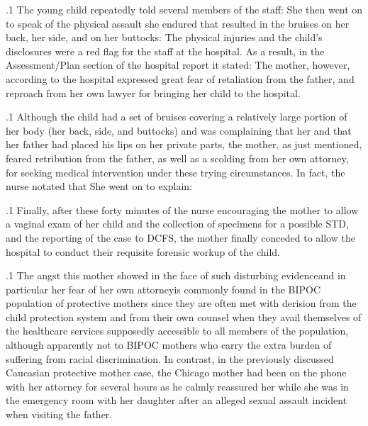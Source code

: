 \documentclass[11pt, twoside]{article}
\begin{document}
{\p.1{%
The young child repeatedly told several members of the staff:  She then went on to speak of the physical assault she endured that resulted in the bruises on her back, her
side, and on her buttocks:  The physical
injuries and the child's disclosures were a red flag for the staff at the
hospital. As a result, in the Assessment/Plan section of the hospital report it stated:  The mother, however, according to the
hospital expressed great fear of retaliation from the father, and reproach
from her own lawyer for bringing her child to the hospital.
}%

\p.1{%
Although the child had a set of bruises covering a relatively large portion of her body (her back, side, and buttocks) and was complaining that
her  and that her father had placed his lips on her
private parts, the mother, as just mentioned, feared retribution from the
father, as well as a scolding from her own attorney, for seeking medical
intervention under these trying circumstances. In fact, the nurse notated
that  She
went on to explain: 
}%

\p.1{%
Finally, after these forty minutes of the nurse encouraging the mother
to allow a vaginal exam of her child and the collection of specimens
for a possible STD, and the reporting of the case to DCFS, the mother
finally conceded to allow the hospital to conduct their requisite forensic
workup of the child.
}%

\p.1{%
The angst this mother showed in the face of such disturbing
evidence\mdash{}and in particular her fear of her own attorney\mdash{}is commonly
found in the BIPOC population of protective mothers since they are
often met with derision from the child protection system and from their
own counsel when they avail themselves of the healthcare services supposedly accessible to all members of the population, although apparently
not to BIPOC mothers who carry the extra burden of suffering from
racial discrimination. In contrast, in the previously discussed
Caucasian protective mother
case, the Chicago mother had been on the phone with her attorney for
several hours as he calmly reassured her while she was in the emergency
room with her daughter after an alleged sexual assault incident when
visiting the father.
}%

}
\end{document}
